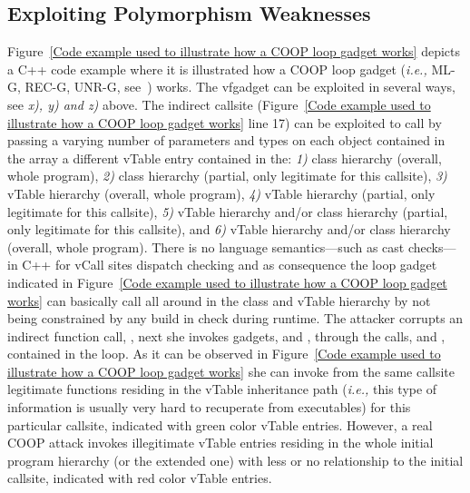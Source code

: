 \subsection{Exploiting Polymorphism Weaknesses}
Figure~\ref{Code example used to illustrate how a COOP loop gadget works}
depicts a C++ code example where it is illustrated how a COOP loop gadget 
(\textit{i.e.,} ML-G, REC-G, UNR-G, see~\cite{crane:readactor++}) works.
The vfgadget  can be exploited in several ways, see \textit{x), y) and z)} above.
The indirect callsite (Figure~\ref{Code example used to illustrate how a COOP loop gadget works} line 17) can be exploited 
to call by passing a varying number of parameters and types
on each object contained in the array a different
vTable entry contained in the:
\textit{1)} class hierarchy (overall, whole program),
\textit{2)} class hierarchy (partial, only legitimate for this callsite),
\textit{3)} vTable hierarchy (overall, whole program),
\textit{4)} vTable hierarchy (partial, only legitimate for this callsite),
\textit{5)} vTable hierarchy and/or class hierarchy (partial, only legitimate for this callsite), and
\textit{6)} vTable hierarchy and/or class hierarchy (overall, whole program).
There is no language semantics---such as cast checks---in C++ for vCall sites dispatch checking and as consequence
the loop gadget indicated in Figure~\ref{Code example used to illustrate how a COOP loop gadget works}
can basically call all around in the class and vTable hierarchy by not being constrained by any build in check during
runtime. The attacker corrupts an indirect function call, , 
next she invokes gadgets,   and , 
through the calls,  and , contained in the loop. 
As it can be observed in Figure~\ref{Code example used to illustrate how a COOP loop gadget works} she 
can invoke from the same callsite legitimate functions residing in the vTable inheritance path
(\textit{i.e.,} this type of information is usually very hard to recuperate from executables)
for this particular callsite, indicated with green color vTable entries. 
However, a real COOP attack invokes illegitimate
vTable entries residing in the whole initial program hierarchy (or the extended one)
with less or no relationship to the initial callsite,
indicated with red color vTable entries.

